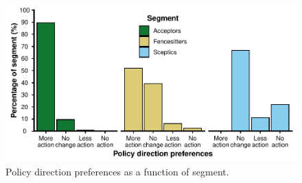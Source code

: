 \documentclass[
  letterpaper,
  DIV=11,
  numbers=noendperiod]{scrartcl}
\begin{document}
\begin{figure}

{\centering \includegraphics{analysis_files/figure-pdf/fig-policy-support-1.pdf}

}

\caption{\label{fig-policy-support}Policy direction preferences as a
function of segment.}

\end{figure}


  
\end{document}
